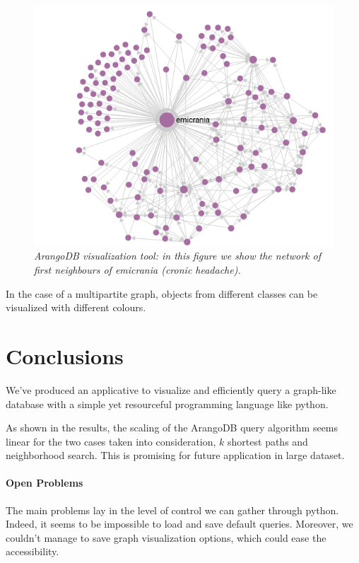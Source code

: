\documentclass[11pt,twocolumn]{article}
\begin{document}
\begin{figure}[ht!]
   \includegraphics[width=\linewidth]{images/neigh_emicrania.png}
   \caption{\small{\textit{ArangoDB visualization tool: in this figure we show the network of first neighbours of \textit{emicrania} (cronic headache).}}}
   \label{fig:4}
\end{figure}

In the case of a multipartite graph, objects from different classes can be visualized with different colours.

\section{Conclusions}
We've produced an applicative to visualize and efficiently query a graph-like database with a simple yet resourceful programming language like python.

As shown in the results, the scaling of the ArangoDB query algorithm seems linear for the two cases taken into consideration, $k$ shortest paths and neighborhood search. This is promising for future application in large dataset.

\paragraph{Open Problems}

The main problems lay in the level of control we can gather through python. Indeed, it seems to be impossible to load and save default queries.
Moreover, we couldn't manage to save graph visualization options, which could ease the accessibility.
\end{document}
